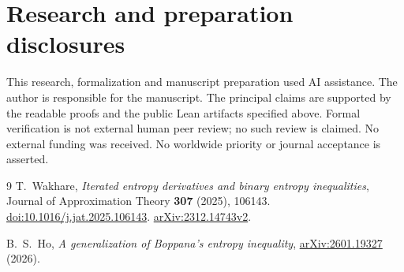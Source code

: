 \documentclass[11pt]{article}
\begin{document}
\section*{Research and preparation disclosures}
This research, formalization and manuscript preparation used AI assistance.
The author is responsible for the manuscript. The principal claims are
supported by the readable proofs and the public Lean artifacts specified
above. Formal verification is not external human peer review; no such review
is claimed. No external funding was received. No worldwide priority or
journal acceptance is asserted.

\begin{thebibliography}{9}
T.~Wakhare, \emph{Iterated entropy derivatives and binary entropy inequalities},
Journal of Approximation Theory \textbf{307} (2025), 106143.
\href{https://doi.org/10.1016/j.jat.2025.106143}{doi:10.1016/j.jat.2025.106143}.
\href{https://arxiv.org/abs/2312.14743v2}{arXiv:2312.14743v2}.

B.~S.~Ho, \emph{A generalization of Boppana's entropy inequality},
\href{https://arxiv.org/abs/2601.19327}{arXiv:2601.19327} (2026).
\end{thebibliography}
\end{document}
